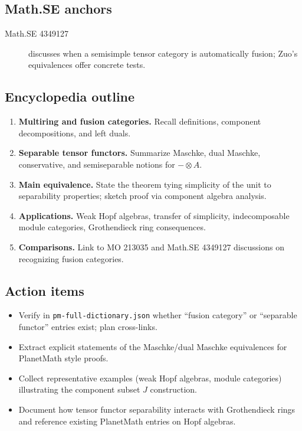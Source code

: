 \subsection*{Math.SE anchors}
\begin{description}
  \item[Math.SE 4349127] discusses when a semisimple tensor category is automatically fusion; Zuo’s equivalences offer concrete tests.
\end{description}
\subsection*{Encyclopedia outline}
\begin{enumerate}
  \item \textbf{Multiring and fusion categories.} Recall definitions, component decompositions, and left duals.
  \item \textbf{Separable tensor functors.} Summarize Maschke, dual Maschke, conservative, and semiseparable notions for $-\otimes A$.
  \item \textbf{Main equivalence.} State the theorem tying simplicity of the unit to separability properties; sketch proof via component algebra analysis.
  \item \textbf{Applications.} Weak Hopf algebras, transfer of simplicity, indecomposable module categories, Grothendieck ring consequences.
  \item \textbf{Comparisons.} Link to MO 213035 and Math.SE 4349127 discussions on recognizing fusion categories.
\end{enumerate}
\subsection*{Action items}
\begin{itemize}
  \item Verify in \texttt{pm-full-dictionary.json} whether ``fusion category'' or ``separable functor'' entries exist; plan cross-links.
  \item Extract explicit statements of the Maschke/dual Maschke equivalences for PlanetMath style proofs.
  \item Collect representative examples (weak Hopf algebras, module categories) illustrating the component subset $J$ construction.
  \item Document how tensor functor separability interacts with Grothendieck rings and reference existing PlanetMath entries on Hopf algebras.
\end{itemize}
